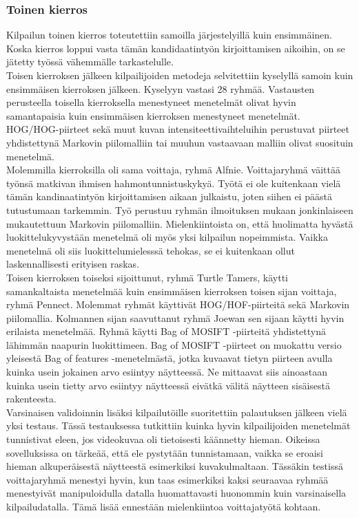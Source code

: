 \newpage
\subsubsection {Toinen kierros}

Kilpailun toinen kierros toteutettiin samoilla järjestelyillä kuin ensimmäinen. Koska kierros loppui
vasta tämän kandidaatintyön kirjoittamisen aikoihin, on se jätetty työssä vähemmälle tarkastelulle.\\

Toisen kierroksen jälkeen kilpailijoiden metodeja selvitettiin kyselyllä samoin kuin ensimmäisen
kierroksen jälkeen. Kyselyyn vastasi 28 ryhmää. Vastausten perusteella toisella kierroksella menestyneet 
menetelmät olivat hyvin samantapaisia kuin ensimmäisen kierroksen menestyneet menetelmät. HOG/HOG-piirteet sekä muut
kuvan intensiteettivaihteluihin perustuvat piirteet yhdistettynä Markovin piilomalliin tai muuhun
vastaavaan malliin olivat suosituin menetelmä. \citep{chalearn2}\\

Molemmilla kierroksilla oli sama voittaja, ryhmä Alfnie. 
Voittajaryhmä väittää työnsä matkivan ihmisen hahmontunnistuskykyä. Työtä ei ole kuitenkaan vielä tämän kandinaatintyön kirjoittamisen aikaan julkaistu,
 joten siihen ei päästä tutustumaan tarkemmin. Työ perustuu
ryhmän ilmoituksen mukaan jonkinlaiseen mukautettuun Markovin piilomalliin. Mielenkiintoista on,
että huolimatta hyvästä luokittelukyvystään menetelmä oli myös yksi kilpailun nopeimmista. Vaikka menetelmä oli siis 
luokittelumielesssä tehokas, se ei kuitenkaan ollut laskennallisesti erityisen raskas. \citep{chalearn2}\\

Toisen kierroksen toiseksi sijoittunut, ryhmä Turtle Tamers, käytti samankaltaista menetelmää kuin 
ensimmäisen kierroksen toisen sijan voittaja, ryhmä Pennect. Molemmat ryhmät käyttivät HOG/HOF-piirteitä sekä Markovin piilomallia. 
Kolmannen sijan saavuttanut ryhmä Joewan sen sijaan käytti hyvin erilaista menetelmää. Ryhmä käytti Bag of MOSIFT -piirteitä 
yhdistettynä lähimmän naapurin luokittimeen. \citep{chalearn2} Bag of MOSIFT -piirteet on muokattu versio
yleisestä Bag of features -menetelmästä, jotka kuvaavat tietyn piirteen avulla
kuinka usein jokainen arvo esiintyy näytteessä. Ne mittaavat siis ainoastaan kuinka usein tietty arvo esiintyy näytteessä eivätkä 
välitä näytteen sisäisestä rakenteesta. \citep{bagoffeatures} \\

Varsinaisen validoinnin lisäksi kilpailutöille suoritettiin palautuksen jälkeen vielä yksi testaus. Tässä testauksessa tutkittiin kuinka 
hyvin kilpailijoiden menetelmät tunnistivat eleen, jos videokuvaa oli tietoisesti käännetty hieman. Oikeissa sovelluksissa on tärkeää,
että ele pystytään tunnistamaan, vaikka se eroaisi hieman alkuperäisestä näytteestä esimerkiksi kuvakulmaltaan. 
Tässäkin testissä voittajaryhmä menestyi hyvin, kun taas esimerkiksi kaksi seuraavaa ryhmää menestyivät manipuloidulla datalla huomattavasti
huonommin kuin varsinaisella kilpailudatalla. Tämä lisää ennestään mielenkiintoa voittajatyötä kohtaan. \citep{chalearn2}



